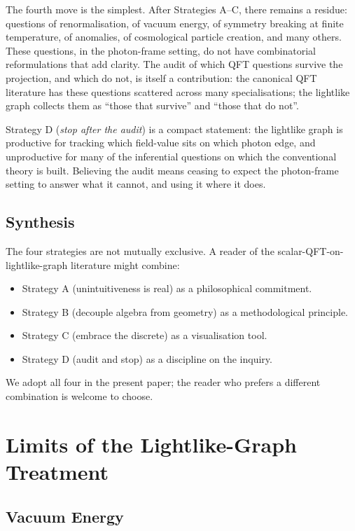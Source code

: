 \documentclass[11pt]{article}
\begin{document}
The fourth move is the simplest. After Strategies A--C, there remains a residue: questions of renormalisation, of vacuum energy, of symmetry breaking at finite temperature, of anomalies, of cosmological particle creation, and many others. These questions, in the photon-frame setting, do not have combinatorial reformulations that add clarity. The audit of which QFT questions survive the projection, and which do not, is itself a contribution: the canonical QFT literature has these questions scattered across many specialisations; the lightlike graph collects them as ``those that survive'' and ``those that do not''.

Strategy D (\emph{stop after the audit}) is a compact statement: the lightlike graph is productive for tracking which field-value sits on which photon edge, and unproductive for many of the inferential questions on which the conventional theory is built. Believing the audit means ceasing to expect the photon-frame setting to answer what it cannot, and using it where it does.

\subsection{Synthesis}

The four strategies are not mutually exclusive. A reader of the scalar-QFT-on-lightlike-graph literature might combine:
\begin{itemize}
    \item Strategy A (unintuitiveness is real) as a philosophical commitment.
    \item Strategy B (decouple algebra from geometry) as a methodological principle.
    \item Strategy C (embrace the discrete) as a visualisation tool.
    \item Strategy D (audit and stop) as a discipline on the inquiry.
\end{itemize}
We adopt all four in the present paper; the reader who prefers a different combination is welcome to choose.

\section{Limits of the Lightlike-Graph Treatment}
\label{sec:limits}

\subsection{Vacuum Energy}
\end{document}
